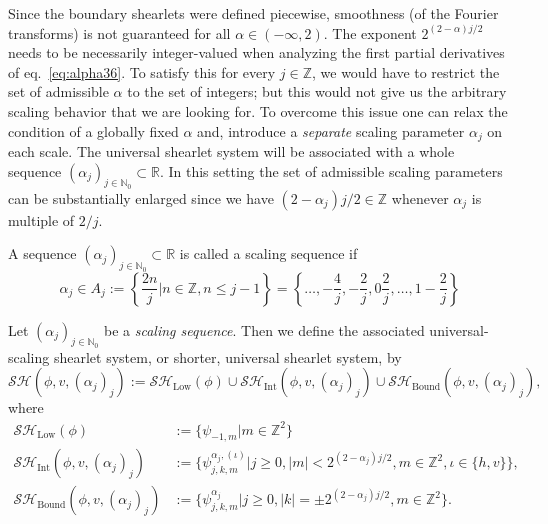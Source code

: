 \bigskip

Since the boundary shearlets were defined piecewise, smoothness (of the Fourier transforms) is not guaranteed for all $\alpha\in (-\infty,2)$. The exponent $2^{(2-\alpha)j/2}$ needs to be necessarily integer-valued when analyzing the first partial derivatives of eq.~\ref{eq:alpha36}. To satisfy this for every $j\in\mathbb{Z}$, we would have to restrict the set of admissible $\alpha$ to the set of integers; but this would not give us the arbitrary scaling behavior that we are looking for. To overcome this issue one can relax the condition of a globally fixed $\alpha$ and, introduce a \textit{separate} scaling parameter $\alpha_j$ on each scale. The universal shearlet system will be associated with a whole sequence $(\alpha_j)_{j\in\mathbb{N}_0}\subset\mathbb{R}$. In this setting the set of admissible scaling parameters can be substantially enlarged since we have $(2-\alpha_j)j/2\in\mathbb{Z}$ whenever $\alpha_j$ is multiple of $2/j$. 

\bigskip

\begin{defn}
\label{def:alpha32}
A sequence $(\alpha_j)_{j\in\mathbb{N}_0}\subset\mathbb{R}$ is called a scaling sequence if 
$$
\alpha_j\in A_j:=\left \{\frac{2n}{j}\big| n\in\mathbb{Z},n\leq j-1\right \}=\left \{\ldots,-\frac{4}{j},-\frac{2}{j},0\frac{2}{j},\ldots,1-\frac{2}{j}\right \}
$$
\end{defn}

\bigskip

\begin{defn}
\label{def:alpha33}
Let $(\alpha_j)_{j\in\mathbb{N}_0}$ be a \textit{scaling sequence}. Then we define the associated universal-scaling shearlet system, or shorter, universal shearlet system, by
$$
\mathcal{SH}(\phi,v,(\alpha_j)_j):=\mathcal{SH}_{\text{Low}}(\phi)\cup\mathcal{SH}_{\text{Int}}(\phi,v,(\alpha_j)_j)\cup\mathcal{SH}_{\text{Bound}}(\phi,v,(\alpha_j)_j),
$$
where
$$
\begin{aligned}
\mathcal{SH}_{\text{Low}}(\phi)&:=\{\psi_{-1,m}|m\in\mathbb{Z}^2\}\\
\mathcal{SH}_{\text{Int}}(\phi,v,(\alpha_j)_j)&:=\{\psi_{j,k,m}^{\alpha_j,(\iota)}|j\geq 0,|m|< 2^{(2-\alpha_j)j/2},m\in\mathbb{Z}^2,\iota\in\{h,v\}\},\\
\mathcal{SH}_{\text{Bound}}(\phi,v,(\alpha_j)_j)&:=\{\psi_{j,k,m}^{\alpha_j}|j\geq 0,|k|=\pm 2^{(2-\alpha_j)j/2},m\in\mathbb{Z}^2\}.
\end{aligned}
$$

\end{defn}

